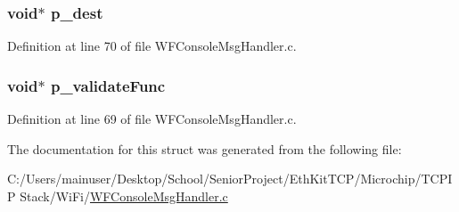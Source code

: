 \subsubsection[{p\+\_\+dest}]{\setlength{\rightskip}{0pt plus 5cm}void$\ast$ p\+\_\+dest}\label{structdata_struct_descriptor_aa1c5b83e492937d1d9d62a6f48082ca8}


Definition at line 70 of file W\+F\+Console\+Msg\+Handler.\+c.

\hypertarget{structdata_struct_descriptor_a7cb32bcc982cd56b117ad607746264bc}{}
\subsubsection[{p\+\_\+validate\+Func}]{\setlength{\rightskip}{0pt plus 5cm}void$\ast$ p\+\_\+validate\+Func}\label{structdata_struct_descriptor_a7cb32bcc982cd56b117ad607746264bc}


Definition at line 69 of file W\+F\+Console\+Msg\+Handler.\+c.



The documentation for this struct was generated from the following file\+:\begin{DoxyCompactItemize}
\item 
C\+:/\+Users/mainuser/\+Desktop/\+School/\+Senior\+Project/\+Eth\+Kit\+T\+C\+P/\+Microchip/\+T\+C\+P\+I\+P Stack/\+Wi\+Fi/\hyperlink{_w_f_console_msg_handler_8c}{W\+F\+Console\+Msg\+Handler.\+c}\end{DoxyCompactItemize}
